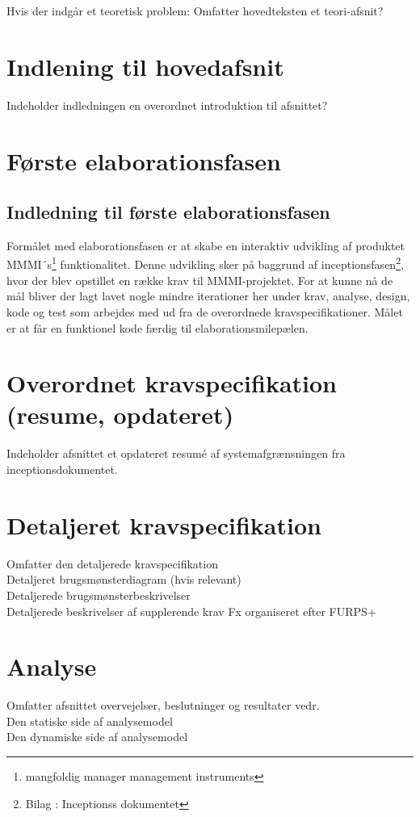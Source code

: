 Hvis der indgår et teoretisk problem: Omfatter hovedteksten et teori-afsnit?\\
\section{Indlening til hovedafsnit}
Indeholder indledningen en overordnet introduktion til afsnittet?\\
\section{Første elaborationsfasen}
\subsection{Indledning til første elaborationsfasen}
Formålet med elaborationsfasen er at skabe en interaktiv udvikling af produktet MMMI´s\footnote{{mangfoldig manager management instruments}} funktionalitet. Denne udvikling sker på baggrund af inceptionsfasen\footnote{{Bilag : Inceptionss dokumentet}}, hvor der blev opstillet en række krav til MMMI-projektet.  For at kunne nå de mål bliver der lagt lavet nogle mindre iterationer her under krav, analyse, design, kode og test som arbejdes med ud fra de overordnede kravspecifikationer. Målet er at får en funktionel kode færdig til elaborationsmilepælen. 



\section{Overordnet kravspecifikation (resume, opdateret)}
Indeholder afsnittet et opdateret resumé  af systemafgrænsningen fra inceptionsdokumentet.
\section{Detaljeret kravspecifikation}
Omfatter den detaljerede kravspecifikation\\
Detaljeret brugsmønsterdiagram (hvis relevant)\\
Detaljerede brugsmønsterbeskrivelser\\
Detaljerede beskrivelser af supplerende krav Fx organiseret efter FURPS+\\

\section{Analyse}
Omfatter afsnittet overvejelser, beslutninger og resultater vedr.\\
Den statiske side af analysemodel\\
Den dynamiske side af analysemodel\\

